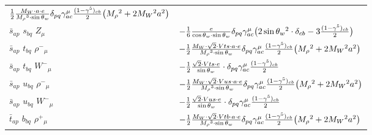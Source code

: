 \begin{center}
\begin{tabular}{|l|l|}
	$\frac{1}{2}\frac{ M_W \cdot a \cdot e}{ M_\rho{}^3  \cdot \sin{\theta}_w}\delta_{p q} \gamma_{a c}^\mu {(1-\gamma^5)_{c b}\over 2} \big( M_\rho{}^2 +2 M_W{}^2  a{}^2 \big)$\\[2mm]
$\bar{s}{}_{a p }$ \phantom{-} $s{}_{b q }$ \phantom{-} ${Z}_{\mu }$ \phantom{-}  &
	$-\frac{1}{6}\frac{ e}{ \cos{\theta}_w \cdot \sin{\theta}_w}\delta_{p q} \gamma_{a c}^\mu \big(2 \sin{\theta}_w{}^2 \cdot \delta_{c b} -3{(1-\gamma^5)_{c b}\over 2} \big)$\\[2mm]
$\bar{s}{}_{a p }$ \phantom{-} $t{}_{b q }$ \phantom{-} $\rho^-{}_{\mu }$ \phantom{-}  &
	$-\frac{1}{2}\frac{ M_W \cdot\sqrt{2} \cdot Vts \cdot a \cdot e}{ M_\rho{}^3  \cdot \sin{\theta}_w}\delta_{p q} \gamma_{a c}^\mu {(1-\gamma^5)_{c b}\over 2} \big( M_\rho{}^2 +2 M_W{}^2  a{}^2 \big)$\\[2mm]
$\bar{s}{}_{a p }$ \phantom{-} $t{}_{b q }$ \phantom{-} $W^-{}_{\mu }$ \phantom{-}  &
	$-\frac{1}{2}\frac{\sqrt{2} \cdot Vts \cdot e}{ \sin{\theta}_w}\cdot \delta_{p q} \gamma_{a c}^\mu {(1-\gamma^5)_{c b}\over 2} $\\[2mm]
$\bar{s}{}_{a p }$ \phantom{-} $u{}_{b q }$ \phantom{-} $\rho^-{}_{\mu }$ \phantom{-}  &
	$-\frac{1}{2}\frac{ M_W \cdot\sqrt{2} \cdot Vus \cdot a \cdot e}{ M_\rho{}^3  \cdot \sin{\theta}_w}\delta_{p q} \gamma_{a c}^\mu {(1-\gamma^5)_{c b}\over 2} \big( M_\rho{}^2 +2 M_W{}^2  a{}^2 \big)$\\[2mm]
$\bar{s}{}_{a p }$ \phantom{-} $u{}_{b q }$ \phantom{-} $W^-{}_{\mu }$ \phantom{-}  &
	$-\frac{1}{2}\frac{\sqrt{2} \cdot Vus \cdot e}{ \sin{\theta}_w}\cdot \delta_{p q} \gamma_{a c}^\mu {(1-\gamma^5)_{c b}\over 2} $\\[2mm]
$\bar{t}{}_{a p }$ \phantom{-} $b{}_{b q }$ \phantom{-} $\rho^+{}_{\mu }$ \phantom{-}  &
	$-\frac{1}{2}\frac{ M_W \cdot\sqrt{2} \cdot Vtb \cdot a \cdot e}{ M_\rho{}^3  \cdot \sin{\theta}_w}\delta_{p q} \gamma_{a c}^\mu {(1-\gamma^5)_{c b}\over 2} \big( M_\rho{}^2 +2 M_W{}^2  a{}^2 \big)$\\ \hline
\end{tabular}


\end{center}
